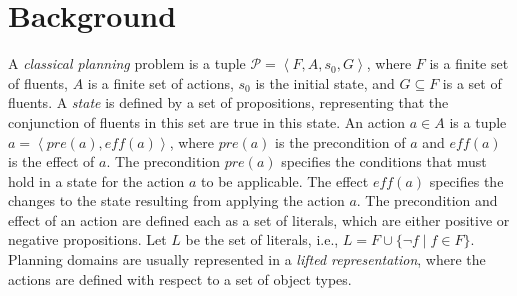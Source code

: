 \documentclass{article}
\theoremstyle{definition}
\theoremstyle{remark}
\newcommand{\tuple}[1]{\ensuremath{\left \langle #1 \right \rangle }}
\newif\ifaddcomments
\newcommand{\roni}[1]{\ifaddcomments{\textcolor{red}{[Roni: #1]}}\fi}
\newcommand{\pascalJr}[1]{\ifaddcomments{\textcolor{cyan}{[Pascal L.: {#1}]}}\fi}
\begin{document}
\section{Background}

A \emph{classical planning} problem is a tuple $\mathcal{P} = \tuple{F, A, s_0, G}$, where $F$ is a finite set of fluents, $A$ is a finite set of actions, $s_0$ is the initial state, and $G\subseteq F$ is a set of fluents. 
A \emph{state} is defined by a set of propositions, representing that the conjunction of fluents in this set are true in this state.
An action $a\in A$ is a tuple $a = \tuple{\mathit{pre}(a), \mathit{eff}(a)}$, where $\mathit{pre}(a)$ is the precondition of $a$ and $\mathit{eff}(a)$ is the effect of $a$. 
The precondition $\mathit{pre}(a)$ specifies the conditions that must hold in a state for the action $a$ to be applicable. The effect $\mathit{eff}(a)$ specifies the changes to the state resulting from applying the action $a$.   
The precondition and effect of an action are defined each as a set of literals, which are either positive or negative propositions. Let $L$ be the set of literals, i.e., 
$L = F \cup \{\neg f \mid f\in F\}$.
Planning domains are usually represented in a \emph{lifted representation}, where the actions are defined with respect to a set of object types.
\end{document}
